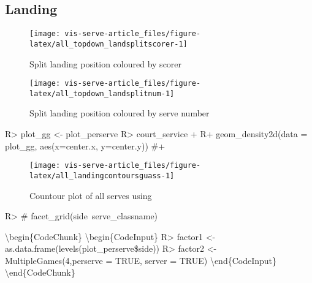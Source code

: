 \documentclass[article]{jss}
\begin{document}
\subsection{Landing}\label{landing}

\begin{CodeChunk}
\begin{figure}

{\centering \texttt{[image: vis-serve-article\_files/figure-latex/all\_topdown\_landsplitscorer-1]} 

}

\caption[Split landing position coloured by scorer]{Split landing position coloured by scorer}\label{fig:all_topdown_landsplitscorer}
\end{figure}
\end{CodeChunk}

\begin{CodeChunk}
\begin{figure}

{\centering \texttt{[image: vis-serve-article\_files/figure-latex/all\_topdown\_landsplitnum-1]} 

}

\caption[Split landing position coloured by serve number]{Split landing position coloured by serve number}\label{fig:all_topdown_landsplitnum}
\end{figure}
\end{CodeChunk}

\begin{CodeChunk}
\begin{CodeInput}
R> plot_gg <- plot_perserve %
R> court_service + 
R+     geom_density2d(data = plot_gg, aes(x=center.x, y=center.y)) #+ 
\end{CodeInput}
\begin{figure}

{\centering \texttt{[image: vis-serve-article\_files/figure-latex/all\_landingcontoursguass-1]} 

}

\caption[Countour plot of all serves using ]{Countour plot of all serves using }\label{fig:all_landingcontoursguass}
\end{figure}
\begin{CodeInput}
R>   # facet_grid(side~serve_classname)
\end{CodeInput}
\end{CodeChunk}

\textbackslash{}begin\{CodeChunk\} \textbackslash{}begin\{CodeInput\}
R\textgreater{} factor1 \textless{}-
as.data.frame(levels(plot\_perserve\$side)) R\textgreater{} factor2
\textless{}- MultipleGames(4,perserve = TRUE, server = TRUE)
\textbackslash{}end\{CodeInput\} \textbackslash{}end\{CodeChunk\}
\end{document}
